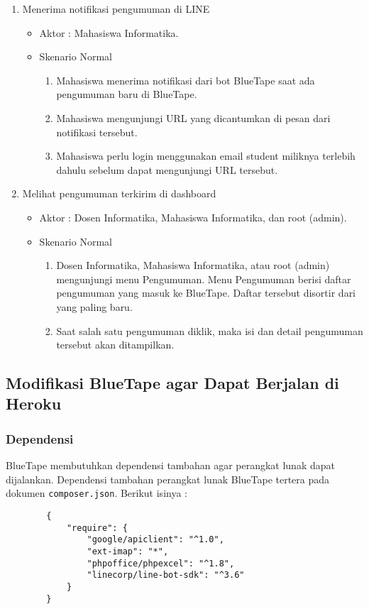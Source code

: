 \begin{enumerate}
\item Menerima notifikasi pengumuman di LINE

\begin{itemize}
	\item Aktor : Mahasiswa Informatika.
	\item Skenario Normal

	\begin{enumerate}
		\item Mahasiswa menerima notifikasi dari bot BlueTape saat ada pengumuman baru di BlueTape.
		\item Mahasiswa mengunjungi URL yang dicantumkan di pesan dari notifikasi tersebut. 
		\item Mahasiswa perlu login menggunakan email student miliknya terlebih dahulu sebelum dapat mengunjungi URL tersebut.
	\end{enumerate}
\end{itemize}

\item Melihat pengumuman terkirim di dashboard

\begin{itemize}
	\item Aktor : Dosen Informatika, Mahasiswa Informatika, dan root (admin).
	\item Skenario Normal

	\begin{enumerate}
		\item Dosen Informatika, Mahasiswa Informatika, atau root (admin) mengunjungi menu Pengumuman. Menu Pengumuman berisi daftar pengumuman yang masuk ke BlueTape. Daftar tersebut disortir dari yang paling baru.
		\item Saat salah satu pengumuman diklik, maka isi dan detail pengumuman tersebut akan ditampilkan.
	\end{enumerate}
\end{itemize}
\end{enumerate}

\subsection{Modifikasi BlueTape agar Dapat Berjalan di Heroku}
	\subsubsection{Dependensi}
		BlueTape membutuhkan dependensi tambahan agar perangkat lunak dapat dijalankan. Dependensi tambahan perangkat lunak BlueTape tertera pada dokumen \texttt{composer.json}. Berikut isinya :
		\begin{lstlisting}
		{
		    "require": {
		        "google/apiclient": "^1.0",
				"ext-imap": "*",
		        "phpoffice/phpexcel": "^1.8",
		        "linecorp/line-bot-sdk": "^3.6"
		    }
		}
		\end{lstlisting}
		
